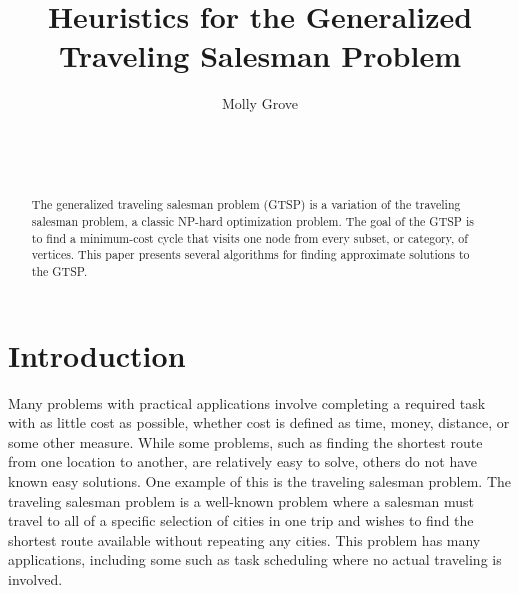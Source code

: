 \documentclass{sig-alternate}
\begin{document}

\title{Heuristics for the Generalized Traveling Salesman Problem}


\author{
\alignauthor
Molly Grove\\
	\\
	\\
	\\
}

\maketitle
\begin{abstract}
The generalized traveling salesman problem (GTSP) is a variation of the traveling salesman problem, a classic NP-hard optimization problem. The goal of the GTSP is to find a minimum-cost cycle that visits one node from every subset, or category, of vertices. This paper presents several algorithms for finding approximate solutions to the GTSP. 
\end{abstract}


\section{Introduction}
\label{sec:introduction}

Many problems with practical applications involve completing a required task with as little cost as possible, whether cost is defined as time, money, distance, or some other measure. While some problems, such as finding the shortest route from one location to another, are relatively easy to solve, others do not have known easy solutions. One example of this is the traveling salesman problem. The traveling salesman problem is a well-known problem where a salesman must travel to all of a specific selection of cities in one trip and wishes to find the shortest route available without repeating any cities. This problem has many applications, including some such as task scheduling where no actual traveling is involved. 
\end{document}
